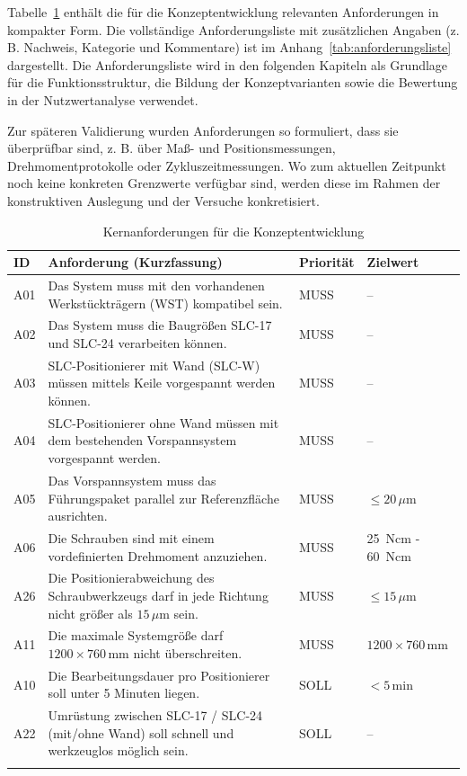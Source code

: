 Tabelle~\ref{tab:anforderungen_kurz} enthält die für die Konzeptentwicklung relevanten Anforderungen in kompakter Form. Die vollständige Anforderungsliste mit zusätzlichen Angaben (z. B. Nachweis, Kategorie und Kommentare) ist im Anhang~\ref{tab:anforderungsliste} dargestellt. Die Anforderungsliste wird in den folgenden Kapiteln als Grundlage für die Funktionsstruktur, die Bildung der Konzeptvarianten sowie die Bewertung in der Nutzwertanalyse verwendet.

Zur späteren Validierung wurden Anforderungen so formuliert, dass sie überprüfbar sind, z. B. über Maß- und Positionsmessungen, Drehmomentprotokolle oder Zykluszeitmessungen. Wo zum aktuellen Zeitpunkt noch keine konkreten Grenzwerte verfügbar sind, werden diese im Rahmen der konstruktiven Auslegung und der Versuche konkretisiert.\\

{
\small
\renewcommand{\arraystretch}{1.4}
\setlength{\tabcolsep}{12pt}

\begin{longtable}{|p{0.4cm}|p{8.0cm}|p{1.5cm}|p{2.0cm}|}
    \hline
        \textbf{ID} & \textbf{Anforderung (Kurzfassung)} & \textbf{Priorität} & \textbf{Zielwert} \\
    \hline
        \endfirsthead
        \endhead
    \hline
        \endfoot
        \endlastfoot
    
        A01 & Das System muss mit den vorhandenen Werkstückträgern (WST) kompatibel sein. & MUSS & -- \\
    \hline
        A02 & Das System muss die Baugrößen SLC-17 und SLC-24 verarbeiten können. & MUSS & -- \\
    \hline
        A03 & SLC-Positionierer mit Wand (SLC-W) müssen mittels Keile vorgespannt werden können. & MUSS & -- \\
    \hline
        A04 & SLC-Positionierer ohne Wand müssen mit dem bestehenden Vorspannsystem vorgespannt werden. & MUSS & -- \\
    \hline
        A05 & Das Vorspannsystem muss das Führungspaket parallel zur Referenzfläche ausrichten. & MUSS & $\le 20\,\mu\mathrm{m}$ \\
    \hline
        A06 & Die Schrauben sind mit einem vordefinierten Drehmoment anzuziehen. & MUSS & \qty{25}{Ncm} - \qty{60}{Ncm} \\
    \hline
        A26 & Die Positionierabweichung des Schraubwerkzeugs darf in jede Richtung nicht größer als $15\,\mu\mathrm{m}$ sein. & MUSS & $\le 15\,\mu\mathrm{m}$ \\
    \hline
        A11 & Die maximale Systemgröße darf $1200 \times 760\,\mathrm{mm}$ nicht überschreiten. & MUSS & $1200 \times 760\,\mathrm{mm}$ \\
    \hline
        A10 & Die Bearbeitungsdauer pro Positionierer soll unter 5 Minuten liegen. & SOLL & $< 5\,\mathrm{min}$ \\
    \hline
        A22 & Umrüstung zwischen SLC-17 / SLC-24 (mit/ohne Wand) soll schnell und werkzeuglos möglich sein. & SOLL & -- \\
    \hline
    
    \caption{Kernanforderungen für die Konzeptentwicklung}
    \label{tab:anforderungen_kurz}
\end{longtable}
}

